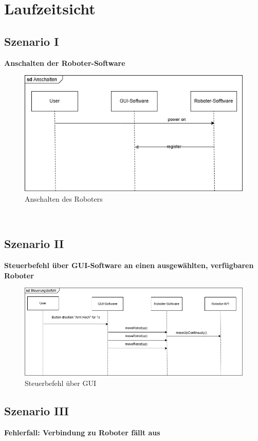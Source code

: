 \chapter{Laufzeitsicht}

\section{Szenario I}
\textbf{Anschalten der Roboter-Software}\\

\begin{figure}[h]
    \centering
    \includegraphics[width=0.8\linewidth]{Docs/diagrams/Anschalten.png}
    \caption{Anschalten des Roboters}
    \label{fig:Anschalten}
\end{figure}
\\
\clearpage
\section{Szenario II}
\textbf{Steuerbefehl über GUI-Software an einen ausgewählten, verfügbaren Roboter}\\

\begin{figure}[h]  
    \centering
    \includegraphics[width=0.8\linewidth]{Docs/diagrams/Steuerungsbefehl.png}
    \caption{Steuerbefehl über GUI}
    \label{fig:Steuerbefehl}
\end{figure}

\clearpage
\section{Szenario III}
\textbf{Fehlerfall: Verbindung zu Roboter fällt aus}\\

